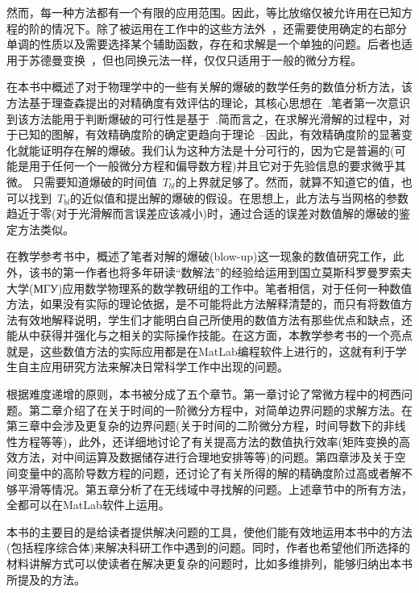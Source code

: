 \documentclass[twoside]{book}
\begin{document}
\begin{CJK*}{GBK}{song}
然而，每一种方法都有一个有限的应用范围。因此，等比放缩仅被允许用在已知方程的阶的情况下。除了被运用在工作中的这些方法外~\cite{Cho}，还需要使用确定的右部分单调的性质以及需要选择某个辅助函数，存在和求解是一个单独的问题。后者也适用于苏德曼变换~\cite{Turner}，但也同换元法一样，仅仅只适用于一般的微分方程。

在本书中概述了对于物理学中的一些有关解的爆破的数学任务的数值分析方法，该方法基于理查森提出的对精确度有效评估的理论，其核心思想在~\cite{BUE_basic_1, BUE_basic_2,Kalitkin_book_3}.笔者第一次意识到该方法能用于判断爆破的可行性是基于~\cite[глава~8]{Al}.简而言之，在求解光滑解的过程中，对于已知的图解，有效精确度阶的确定更趋向于理论~--因此，有效精确度阶的显著变化就能证明存在解的爆破。我们认为这种方法是十分可行的，因为它是普遍的(可能是用于任何一个一般微分方程和偏导数方程)并且它对于先验信息的要求微乎其微。 只需要知道爆破的时间值~$T_{bl}$的上界就足够了。然而，就算不知道它的值，也可以找到~$T_{bl}$的近似值和提出解的爆破的假设。在思想上，此方法与当网格的参数趋近于零(对于光滑解而言误差应该减小)时，通过合适的误差对数值解的爆破的鉴定方法类似。

在教学参考书中，概述了笔者对解的爆破(blow-up)这一现象的数值研究工作，此外，该书的第一作者也将多年研读“数解法”的经验给运用到国立莫斯科罗曼罗索夫大学(МГУ)应用数学物理系的数学教研组的工作中。笔者相信，对于任何一种数值方法，如果没有实际的理论依据，是不可能将此方法解释清楚的，而只有将数值方法有效地解释说明，学生们才能明白自己所使用的数值方法有那些优点和缺点，还能从中获得并强化与之相关的实际操作技能。在这方面，本教学参考书的一个亮点就是，这些数值方法的实际应用都是在MatLab编程软件上进行的，这就有利于学生自主应用研究方法来解决日常科学工作中出现的问题。

根据难度递增的原则，本书被分成了五个章节。第一章讨论了常微方程中的柯西问题。第二章介绍了在关于时间的一阶微分方程中，对简单边界问题的求解方法。在第三章中会涉及更复杂的边界问题(关于时间的二阶微分方程，时间导数下的非线性方程等等)，此外，还详细地讨论了有关提高方法的数值执行效率(矩阵变换的高效方法，对中间运算及数据储存进行合理地安排等等)的问题。第四章涉及关于空间变量中的高阶导数方程的问题，还讨论了有关所得的解的精确度阶过高或者解不够平滑等情况。第五章分析了在无线域中寻找解的问题。上述章节中的所有方法，全都可以在MatLab软件上运用。


本书的主要目的是给读者提供解决问题的工具，使他们能有效地运用本书中的方法(包括程序综合体)来解决科研工作中遇到的问题。同时，作者也希望他们所选择的材料讲解方式可以使读者在解决更复杂的问题时，比如多维排列，能够归纳出本书所提及的方法。



\end{CJK*}
\end{document}
